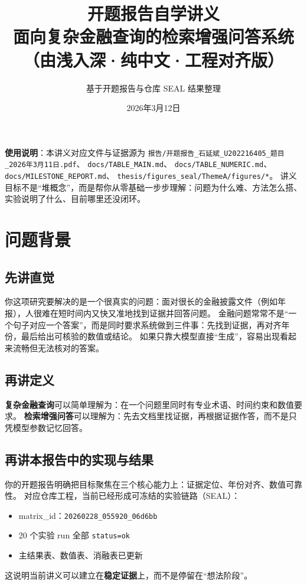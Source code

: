 \documentclass[UTF8,a4paper,12pt]{ctexart}
\title{\heiti 开题报告自学讲义\\[0.4em]
\Large 面向复杂金融查询的检索增强问答系统\\
\large （由浅入深·纯中文·工程对齐版）}
\author{基于开题报告与仓库 SEAL 结果整理}
\date{2026年3月12日}
\begin{document}
\maketitle
\thispagestyle{empty}

\begin{center}
\begin{minipage}{0.92\textwidth}
\small
\textbf{使用说明}：本讲义对应文件与证据源为
\texttt{报告/开题报告\_石延斌\_U202216405\_题目\_2026年3月11日.pdf}、
\texttt{docs/TABLE\_MAIN.md}、
\texttt{docs/TABLE\_NUMERIC.md}、
\texttt{docs/MILESTONE\_REPORT.md}、
\texttt{thesis/figures\_seal/ThemeA/figures/*}。
讲义目标不是“堆概念”，而是帮你从零基础一步步理解：问题为什么难、方法怎么搭、实验说明了什么、目前哪里还没闭环。
\end{minipage}
\end{center}

\newpage
\tableofcontents
\newpage

\section{问题背景}
\subsection{先讲直觉}
你这项研究要解决的是一个很真实的问题：面对很长的金融披露文件（例如年报），人很难在短时间内又快又准地找到证据并回答问题。
金融问题常常不是“一个句子对应一个答案”，而是同时要求系统做到三件事：先找到证据，再对齐年份，最后给出可核验的数值或结论。
如果只靠大模型直接“生成”，容易出现看起来流畅但无法核对的答案。

\subsection{再讲定义}
\textbf{复杂金融查询}可以简单理解为：在一个问题里同时有专业术语、时间约束和数值要求。  
\textbf{检索增强问答}可以理解为：先去文档里找证据，再根据证据作答，而不是只凭模型参数记忆回答。

\subsection{再讲本报告中的实现与结果}
你的开题报告明确把目标聚焦在三个核心能力上：证据定位、年份对齐、数值可靠性。
对应仓库工程，当前已经形成可冻结的实验链路（SEAL）：
\begin{itemize}
  \item matrix\_id：\texttt{20260228\_055920\_06d6bb}
  \item 20 个实验 run 全部 \texttt{status=ok}
  \item 主结果表、数值表、消融表已更新
\end{itemize}
这说明当前讲义可以建立在\textbf{稳定证据}上，而不是停留在“想法阶段”。
\end{document}
